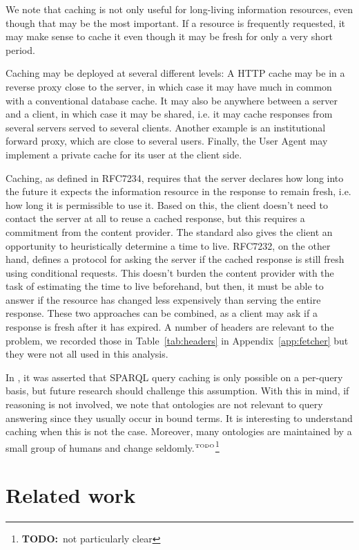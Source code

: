 \documentclass{llncs}
\newcommand{\todo}[1]{\ensuremath{^{\textrm{\tiny{TODO}\normalsize}}}\footnote{\textbf{TODO:}~#1}}
\begin{document}
We note that caching is not only useful for long-living information
resources, even though that may be the most important. If a resource
is frequently requested, it may make sense to cache it even though it
may be fresh for only a very short period.

Caching may be deployed at several different levels: A HTTP cache may
be in a reverse proxy close to the server, in which case it may have
much in common with a conventional database cache. It may also be
anywhere between a server and a client, in which case it may be
shared, i.e. it may cache responses from several servers served to
several clients. Another example is an institutional forward proxy,
which are close to several users. Finally, the User Agent may
implement a private cache for its user at the client side.

Caching, as defined in RFC7234, requires that the server declares how
long into the future it expects the information resource in the
response to remain fresh, i.e. how long it is permissible to use
it. Based on this, the client doesn't need to contact the server at
all to reuse a cached response, but this requires a commitment from
the content provider. The standard also gives the client an
opportunity to heuristically determine a time to live. RFC7232, on the
other hand, defines a protocol for asking the server if the cached
response is still fresh using conditional requests. This doesn't
burden the content provider with the task of estimating the time to
live beforehand, but then, it must be able to answer if the resource
has changed less expensively than serving the entire response. These
two approaches can be combined, as a client may ask if a response is
fresh after it has expired. A number of headers are relevant to the
problem, we recorded those in Table~\ref{tab:headers} in
Appendix~\ref{app:fetcher} but they were not all used in this analysis. 

In \cite{ldf1}, it was asserted that SPARQL query caching is only
possible on a per-query basis, but future research should challenge
this assumption. With this in mind, if reasoning is not involved, we
note that ontologies are not relevant to query answering since they
usually occur in bound terms. It is interesting to understand caching
when this is not the case. Moreover, many ontologies are maintained by
a small group of humans and change seldomly.\todo{not particularly clear}

\section{Related work}
\end{document}
